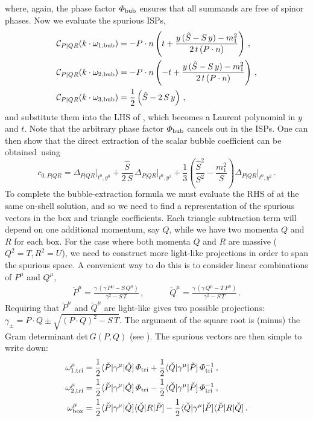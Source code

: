 where, again, the phase factor $\Phi_{\rm bub}$ ensures that all summands are free of spinor phases.
Now we evaluate the spurious ISPs,
\begin{align}
  \mathcal{C}_{P|QR}(k\cdot\omega_{1,{\rm bub}})  &= - P\cdot n \left(t + \frac{y \, (\hat{S} - S \, y) - m_1^2}{2 \, t \, (P\cdot n)}\right) \,,\\
  \mathcal{C}_{P|QR}(k\cdot\omega_{2,{\rm bub}})  &= - P\cdot n \left(-t + \frac{y \, (\hat{S} - S \, y) - m_1^2}{2 \, t \, (P\cdot n)}\right) \,,\\
  \mathcal{C}_{P|QR}(k\cdot\omega_{3,{\rm bub}})  &= \frac{1}{2}\left( \hat{S}- 2 \, S \, y \right) \,,
\end{align}
and substitute them into the LHS of , which
becomes a Laurent polynomial in $y$ and $t$. Note that the arbitrary phase factor $\Phi_{\rm bub}$ cancels out in the ISPs. One can then show that the direct
extraction of the scalar bubble coefficient can be obtained~using
\begin{equation}
  c_{0;P|QR} = \Delta_{P|QR}\bigl|_{t^0,y^0} + \frac{\hat{S}}{2 \, S} \, \Delta_{P|QR} \bigl|_{t^0,y^1}+ \frac{1}{3}\left( \frac{\hat{S}^2}{S^2} - \frac{m_1^2}{S} \right)\Delta_{P|QR}\bigl|_{t^0,y^2} \,.
  \label{eq:directbubform}
\end{equation}
To complete the bubble-extraction formula we must evaluate the RHS of
 at the same on-shell solution, and so we need to find a
representation of the spurious vectors in the box and triangle coefficients. Each
triangle subtraction term will depend on one additional momentum, say $Q$, while we have
two momenta $Q$ and $R$ for each box. For the case where both momenta $Q$ and
$R$ are massive ($Q^2 = T, R^2 = U$), we need to construct more light-like
projections in order to span the spurious space. A convenient way to do this is to consider linear combinations of $P^{\mu}$ and $Q^{\mu}$,
\begin{align}
  \check{P}^{\mu} = \frac{\gamma \, (\gamma \, P^\mu - S \, Q^\mu)}{\gamma^2 - S \, T} \,, \qquad \quad
  \check{Q}^{\mu} =  \frac{\gamma \, (\gamma \, Q^\mu - T \, P^\mu)}{\gamma^2 - S \, T} \,.
\end{align}
Requiring that $\check{P}^{\mu}$ and $\check{Q}^{\mu}$ are light-like gives two possible projections: $\gamma_{\pm} = P \cdot Q \pm \sqrt{(P\cdot Q)^2 -
S \, T}$. The argument of the square root is (minus) the Gram determinant $\mathrm{det} \, G(P,Q)$ (see ). The spurious
vectors are then simple to write down:
\begin{align} \label{eq:spurious_vectors_tri_box}
  \omega_{1,{\rm tri}}^\mu &= \frac{1}{2}\spAB{\check{P}}{\gamma^\mu}{\check{Q}} \, \Phi_{\rm tri} + \frac{1}{2}\spAB{\check{Q}}{\gamma^\mu}{\check{P}} \, \Phi_{\rm tri}^{-1} \,,\\ 
  \omega_{2,{\rm tri}}^\mu &= \frac{1}{2}\spAB{\check{P}}{\gamma^\mu}{\check{Q}}\, \Phi_{\rm tri} - \frac{1}{2}\spAB{\check{Q}}{\gamma^\mu}{\check{P}}\, \Phi_{\rm tri}^{-1} \,,\\ 
  \omega_{\rm box}^\mu &= \frac{1}{2}\spAB{\check{P}}{\gamma^\mu}{\check{Q}} \spAB{\check{Q}}{R}{\check{P}} - \frac{1}{2}\spAB{\check{Q}}{\gamma^\mu}{\check{P}} \spAB{\check{P}}{R}{\check{Q}} \,.
\end{align}
